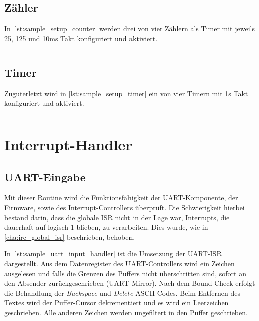 \begin{code}
	\inputminted[autogobble, firstline=61, lastline=68, firstnumber=61]{C}{attachments/Plasma-SoC/sw/examples/src/sample.c}
	\caption{Display Setup}
	\label{lst:sample_setup_display}
\end{code}

\subsection{Zähler}
In \cref{lst:sample_setup_counter} werden drei von vier Zählern als Timer mit jeweils 25, 125 und 10ms Takt konfiguriert und aktiviert.

\begin{code}
	\inputminted[autogobble, firstline=70, lastline=81, firstnumber=70]{C}{attachments/Plasma-SoC/sw/examples/src/sample.c}
	\caption{Zähler Setup}
	\label{lst:sample_setup_counter}
\end{code}

\subsection{Timer}
Zuguterletzt wird in \cref{lst:sample_setup_timer} ein von vier Timern mit 1s Takt konfiguriert und aktiviert.

\begin{code}	
	\inputminted[autogobble, firstline=83, lastline=87, firstnumber=83]{C}{attachments/Plasma-SoC/sw/examples/src/sample.c}
	\caption{Timer Setup}
	\label{lst:sample_setup_timer}
\end{code}

\section{Interrupt-Handler}

\subsection{UART-Eingabe}
\label{cha:sample_uart_input_handler}

Mit dieser Routine wird die Funktionsfähigkeit der UART-Komponente, der Firmware, sowie des Interrupt-Controllers überprüft. Die Schwierigkeit hierbei bestand darin, dass die globale \gls{ISR} nicht in der Lage war, Interrupts, die dauerhaft auf logisch 1 blieben, zu verarbeiten. Dies wurde, wie in \cref{cha:irc_global_isr} beschrieben, behoben.

In \cref{lst:sample_uart_input_handler} ist die Umsetzung der UART-\gls{ISR} dargestellt. Aus dem Datenregister des UART-Controllers wird ein Zeichen ausgelesen und falls die Grenzen des Puffers nicht überschritten sind, sofort an den Absender zurückgeschrieben (UART-Mirror).
Nach dem Bound-Check erfolgt die Behandlung der \textit{Backspace} und \textit{Delete}-ASCII-Codes. Beim Entfernen des Textes wird der Puffer-Cursor dekrementiert und es wird ein Leerzeichen geschrieben. Alle anderen Zeichen werden ungefiltert in den Puffer geschrieben.

